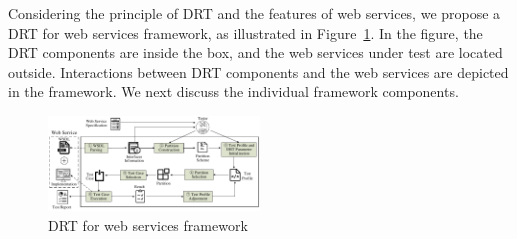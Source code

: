 \documentclass[10pt,journal,compsoc]{IEEEtran}
\begin{document}
Considering the principle of DRT and the features of web services, we propose a DRT for web services framework, as illustrated in Figure~\ref{fig:frame}.
In the figure, the DRT components are inside the box, and the web services under test are located outside.
Interactions between DRT components and the web services are depicted in the framework.
We next discuss the individual framework components.

\begin{figure}[]
  \centering
  \includegraphics[width = 0.5\textwidth]{fig//framework.pdf}
  \caption{DRT for web services framework}
  \label{fig:frame}
\end{figure}
\end{document}
